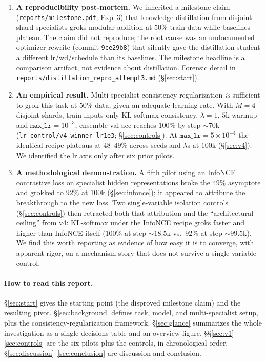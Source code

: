 \documentclass[11pt,a4paper]{article}
\begin{document}
\begin{enumerate}[leftmargin=*,itemsep=3pt]
\item \textbf{A reproducibility post-mortem.} We inherited a milestone
      claim (\texttt{reports/milestone.pdf}, Exp~3) that knowledge
      distillation from disjoint-shard specialists groks modular
      addition at $50\%$ train data while baselines plateau. The
      claim did not reproduce; the root cause was an undocumented
      optimizer rewrite (commit \texttt{9ce29b8}) that silently gave
      the distillation student a different lr/wd/schedule than its
      baselines. The milestone headline is a comparison artifact,
      not evidence about distillation. Forensic detail in
      \texttt{reports/distillation\_repro\_attempt3.md} (\S\ref{sec:start}).
\item \textbf{An empirical result.} Multi-specialist consistency
      regularization \emph{is} sufficient to grok this task at $50\%$
      data, given an adequate learning rate. With $M{=}4$ disjoint
      shards, train-inputs-only KL-softmax consistency, $\lambda{=}1$,
      $5$k warmup and $\mathtt{max\_lr}{=}10^{-3}$, ensemble val acc
      reaches $100\%$ by step $\sim$$70$k
      (\texttt{lr\_control/v4\_winner\_lr1e3}; \S\ref{sec:controls}).
      At $\mathtt{max\_lr}{=}5{\times}10^{-4}$ the identical recipe
      plateaus at $48$--$49\%$ across seeds and $\lambda$s at
      $100$k (\S\ref{sec:v4}). We identified the lr axis only after
      six prior pilots.
\item \textbf{A methodological demonstration.} A fifth pilot using an
      InfoNCE contrastive loss on specialist hidden representations
      broke the $49\%$ asymptote and grokked to $92\%$ at $100$k
      (\S\ref{sec:infonce}); it appeared to attribute the
      breakthrough to the new loss. Two single-variable isolation
      controls (\S\ref{sec:controls}) then retracted both that
      attribution and the ``architectural ceiling'' from v4:
      KL-softmax under the InfoNCE recipe groks faster and higher
      than InfoNCE itself ($100\%$ at step $\sim$$18.5$k vs.\ $92\%$
      at step $\sim$$99.5$k). We find this worth reporting as
      evidence of how easy it is to converge, with apparent rigor,
      on a mechanism story that does not survive a single-variable
      control.
\end{enumerate}

\paragraph{How to read this report.} \S\ref{sec:start} gives the
starting point (the disproved milestone claim) and the resulting
pivot. \S\ref{sec:background} defines task, model, and multi-specialist
setup, plus the consistency-regularization framework. \S\ref{sec:glance}
summarizes the whole investigation as a single decisions table and an
overview figure. \S\S\ref{sec:v1}--\ref{sec:controls} are the six
pilots plus the controls, in chronological order.
\S\ref{sec:discussion}--\ref{sec:conclusion} are discussion and
conclusion.
\end{document}
